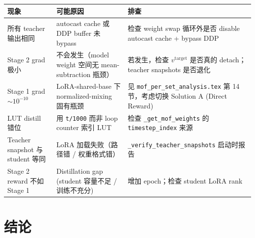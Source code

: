\documentclass[11pt,a4paper]{article}
\theoremstyle{definition}
\begin{document}
\begin{center}
\renewcommand{\arraystretch}{1.4}
\footnotesize
\begin{tabular}{@{}p{4.5cm} p{5cm} p{4cm}@{}}
\toprule
\textbf{现象} & \textbf{可能原因} & \textbf{排查} \\
\midrule
所有 teacher 输出相同 & autocast cache 或 DDP buffer 未 bypass
& 检查 weight swap 循环外是否 disable autocast cache + bypass DDP \\
Stage 2 grad 极小 & 不会发生（model weight 空间无 mean-subtraction 瓶颈）
& 若发生，检查 $v^{\text{target}}$ 是否真的 detach；teacher snapshots 是否退化 \\
Stage 1 grad $\sim 10^{-10}$ & LoRA-shared-base 下 normalized-mixing 固有瓶颈
& 见 \texttt{mof\_per\_set\_analysis.tex} 第 14 节，考虑切换 Solution A (Direct Reward) \\
LUT distill 错位 & 用 \texttt{t/1000} 而非 loop counter 索引 LUT
& 检查 \texttt{\_get\_mof\_weights} 的 \texttt{timestep\_index} 来源 \\
Teacher snapshot 与 student 等同 & LoRA 加载失败（路径错 / 权重格式错）
& \texttt{\_verify\_teacher\_snapshots} 启动时报告 \\
Stage 2 reward 不如 Stage 1 & Distillation gap (student 容量不足 / 训练不充分)
& 增加 epoch；检查 student LoRA rank \\
\bottomrule
\end{tabular}
\end{center}

\section{结论}
\label{sec:conclusion}
\end{document}
